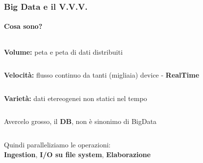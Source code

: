 \begin{frame}
\frametitle{Big Data e il V.V.V.}
\framesubtitle{Cosa sono?}

	\begin{columns}
		\begin{block}{}
		\begin{center} \textbf{\tit Volume: } peta e peta di dati distribuiti \end{center}
		\end{block}
	\end{columns}	

	\begin{columns}
		\column{0.8\textwidth}
		\begin{block}{}
		\begin{center} \textbf{\tit Velocità: } flusso continuo da tanti (migliaia) device - \textbf{RealTime}\end{center}
		\end{block}
	\end{columns}
	
	\begin{columns}
		\column{0.8\textwidth}
		\begin{block}{}
		\begin{center} \textbf{\tit Varietà: } dati etereogenei non statici nel tempo\end{center}
		\end{block}
	\end{columns}

	\begin{columns}
		\begin{block}{}
		\begin{center} {\huge \tit \danger}  Avercelo grosso, il \textbf{DB}, non è sinonimo di BigData \end{center}

		\end{block}
	\end{columns}

\vspace{1cm}

\begin{center}
{\gray Quindi paralleliziamo le operazioni:\\ \textbf{Ingestion}, \textbf{I/O su file system}, \textbf{Elaborazione} }
\end{center}

\end{frame}


